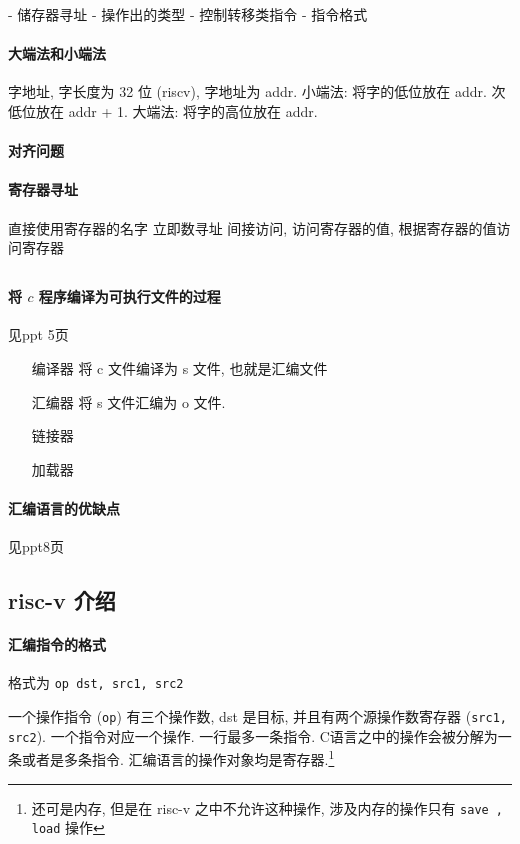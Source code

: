 \documentclass[12pt]{ctexart}
\theoremstyle{definition}
\theoremstyle{definition}
\theoremstyle{plain}
\begin{document}
- 储存器寻址
- 操作出的类型
- 控制转移类指令
- 指令格式

\paragraph{大端法和小端法}
字地址, 字长度为 32 位 (riscv), 字地址为 addr.
小端法: 将字的低位放在 addr. 次低位放在 addr + 1.
大端法: 将字的高位放在 addr. 

\paragraph{对齐问题}

\paragraph{寄存器寻址}
直接使用寄存器的名字
立即数寻址
间接访问, 访问寄存器的值, 根据寄存器的值访问寄存器

\subsection{}
\paragraph{将 \(c\) 程序编译为可执行文件的过程}
见ppt 5页
\begin{itemize}
\item [编译器] 将 c 文件编译为 s 文件, 也就是汇编文件
\item [汇编器] 将 s 文件汇编为 o 文件. 
\item [链接器] 
\item [加载器] 
\end{itemize}

\paragraph{汇编语言的优缺点}
见ppt8页

\subsection{risc-v 介绍}\label{sse:op}
\paragraph{汇编指令的格式}
格式为 \texttt{op dst, src1, src2} 

一个操作指令 (\texttt{op}) 有三个操作数, dst 是目标, 并且有两个源操作数寄存器 (\texttt{src1, src2}). 
一个指令对应一个操作. 一行最多一条指令. C语言之中的操作会被分解为一条或者是多条指令. 
汇编语言的操作对象均是寄存器.\footnote{还可是内存, 但是在 risc-v 之中不允许这种操作, 涉及内存的操作只有 \texttt{save , load} 操作}
\end{document}

